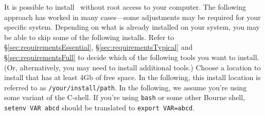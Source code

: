 It is possible to install \glc\ without root access to your computer. The following approach has worked in many cases---some adjustments may be required for your specific system. Depending on what is already installed on your system, you may be able to skip some of the following installs. Refer to \S\ref{sec:requirementsEssential}, \S\ref{sec:requirementsTypical} and \S\ref{sec:requirementsFull} to decide which of the following tools you want to install. (Or, alternatively, you may need to install additional tools.) Choose a location to install that has at least 4Gb of free space. In the following, this install location is referred to as {\tt /your/install/path}. In the following, we assume you're using some variant of the C-shell. If you're using {\tt bash} or some other Bourne shell, {\tt setenv VAR abcd} should be translated to {\tt export VAR=abcd}.

